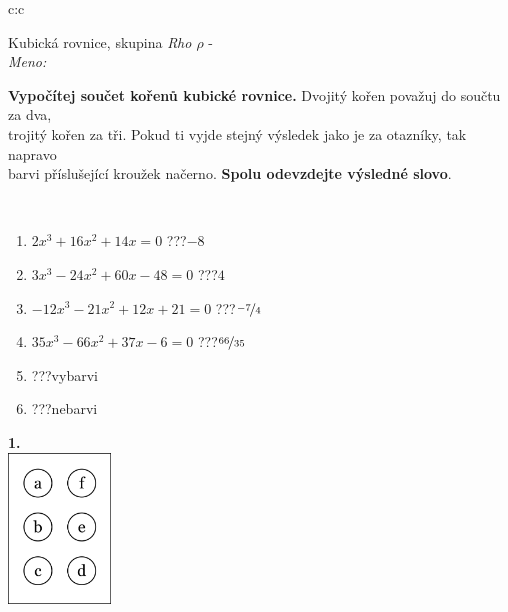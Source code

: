 \documentclass[10pt]{report}
\begin{document}
\begin{tabular}{c:c}
\begin{minipage}[c][104.5mm][t]{0.5\linewidth}
\begin{center}
\vspace{7mm}
{\huge Kubická rovnice, skupina \textit{Rho $\rho$} -}\\[5mm]
\textit{Meno:}\phantom{xxxxxxxxxxxxxxxxxxxxxxxxxxxxxxxxxxxxxxxxxxxxxxxxxxxxxxxxxxxxxxxxx}\\[5mm]
\begin{minipage}{0.95\linewidth}
\textbf{Vypočítej součet kořenů kubické rovnice.} Dvojitý kořen považuj do součtu za dva,\\trojitý kořen za tři. Pokud ti vyjde stejný výsledek jako je za otazníky, tak napravo\\barvi příslušející kroužek načerno. \textbf{Spolu odevzdejte výsledné slovo}.
\end{minipage}
\\[1mm]
\begin{minipage}{0.79\linewidth}
\begin{center}
\begin{varwidth}{\linewidth}
\begin{enumerate}
\Large
\item $2x^3+16x^2+14x=0$\quad \dotfill\; ???\;\dotfill \quad $-8$
\item $3x^3-24x^2+60x-48=0$\quad \dotfill\; ???\;\dotfill \quad $4$
\item $-12x^3-21x^2+12x+21=0$\quad \dotfill\; ???\;\dotfill \quad $\nicefrac{-7}{4}$
\item $35x^3-66x^2+37x-6=0$\quad \dotfill\; ???\;\dotfill \quad $\nicefrac{66}{35}$
\item \quad \dotfill\; ???\;\dotfill \quad vybarvi
\item \quad \dotfill\; ???\;\dotfill \quad nebarvi
\end{enumerate}
\end{varwidth}
\end{center}
\end{minipage}
\begin{minipage}{0.20\linewidth}
\begin{center}
{\Huge\bfseries 1.} \\[2mm]
\includegraphics[height=40mm]{../images/braille.png}

\end{center}
\end{minipage}
\end{center}
\end{minipage}
\end{tabular}
\end{document}
